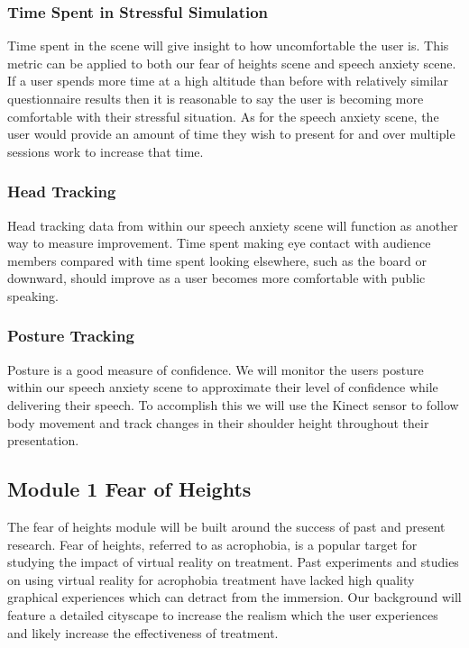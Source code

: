 \documentclass[a4paper,10pt]{article}
\begin{document}
\subsubsection{Time Spent in Stressful Simulation}
Time spent in the scene will give insight to how uncomfortable the user is. This metric can be applied to both our fear of heights scene and speech anxiety scene. If a user spends more time at a high altitude than before with relatively similar questionnaire results then it is reasonable to say the user is becoming more comfortable with their stressful situation. As for the speech anxiety scene, the user would provide an amount of time they wish to present for and over multiple sessions work to increase that time.

\subsubsection{Head Tracking}
Head tracking data from within our speech anxiety scene will function as another way to measure improvement. Time spent making eye contact with audience members compared with time spent looking elsewhere, such as the board or downward, should improve as a user becomes more comfortable with public speaking.

\subsubsection{Posture Tracking} %
Posture is a good measure of confidence. We will monitor the users posture within our speech anxiety scene to approximate their level of confidence while delivering their speech. To accomplish this we will use the Kinect sensor to follow body movement and track changes in their shoulder height throughout their presentation.


\pagebreak
\subsection{Module 1 Fear of Heights}
The fear of heights module will be built around the success of past and present research. Fear of heights, referred to as acrophobia, is a popular target for studying the impact of virtual reality on treatment. Past experiments and studies on using virtual reality for acrophobia treatment have lacked high quality graphical experiences which can detract from the immersion. Our background will feature a detailed cityscape to increase the realism which the user experiences and likely increase the effectiveness of treatment.
\end{document}
